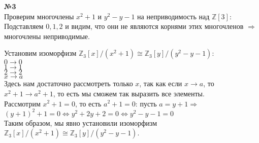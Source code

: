 \documentclass[a4paper, 12pt]{article}
\newcommand{\Z}{\mathbb{Z}}
\begin{document}
	
	
	\textbf{№3} \\
	
	Проверим многочлены $x^2+1$ и $y^2-y-1$ на неприводимость над $\Z[3]$: \\
	Подставляем  $0, 1, 2$ и видим, что они не являются корнями этих многочленов $\Rightarrow$ многочлены неприводимые.
	
	Установим изоморфизм $\Z_3[x]/(x^2+1)\cong\Z_3[y]/(y^2-y-1)$: \\
	$0\longrightarrow0$ \\
	$1\longrightarrow1$ \\
	$2\longrightarrow2$ \\
	$x\longrightarrow a$ \\
	Здесь нам достаточно рассмотреть только $x$, так как если $x\longrightarrow a$, то $x^2+1\longrightarrow a^2+1$, то есть мы сможем так выразить все элементы. \\
	Рассмотрим $x^2+1=0$, то есть $a^2+1=0$: пусть $a = y+1 \Rightarrow$ \\
	$(y+1)^2+1=0 \Leftrightarrow y^2+2y+2=0 \Leftrightarrow y^2-y-1=0$ \\
	Таким образом, мы явно установили изоморфизм $\Z_3[x]/(x^2+1)\cong\Z_3[y]/(y^2-y-1)$.
	
\end{document}
